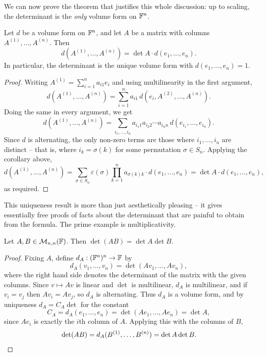 \documentclass[a4paper]{scrartcl}
\begin{document}
We can now prove the theorem that justifies this whole discussion: up to scaling, the determinant is the \emph{only} volume form on $\mathbb{F}^n$.

\begin{theorem}
    Let $d$ be a volume form on $\mathbb{F}^n$, and let $A$ be a matrix with columns $A^{(1)}, \dots, A^{(n)}$. Then
    $$
    d(A^{(1)}, \dots, A^{(n)}) = \det A \cdot d(e_1, \dots, e_n).
    $$
    In particular, the determinant is the unique volume form with $d(e_1, \dots, e_n) = 1$.
\end{theorem}
\begin{proof}
    Writing $A^{(1)} = \sum_{i = 1}^n a_{i1}e_i$ and using multilinearity in the first argument,
    $$
    d(A^{(1)}, \dots, A^{(n)}) = \sum_{i = 1}^n a_{i1}\, d(e_i, A^{(2)}, \dots, A^{(n)}).
    $$
    Doing the same in every argument, we get
    $$
    d(A^{(1)}, \dots, A^{(n)}) = \sum_{i_1, \dots, i_n} a_{i_1 1} a_{i_2 2}\cdots a_{i_n n}\, d(e_{i_1}, \dots, e_{i_n}).
    $$
    Since $d$ is alternating, the only non-zero terms are those where $i_1, \dots, i_n$ are distinct -- that is, where $i_k = \sigma(k)$ for some permutation $\sigma \in S_n$. Applying the corollary above,
    $$
    d(A^{(1)}, \dots, A^{(n)}) = \sum_{\sigma \in S_n} \varepsilon(\sigma) \prod_{k = 1}^n a_{\sigma(k)k} \cdot d(e_1, \dots, e_n) = \det A \cdot d(e_1, \dots, e_n),
    $$
    as required.
\end{proof}

This uniqueness result is more than just aesthetically pleasing -- it gives essentially free proofs of facts about the determinant that are painful to obtain from the formula. The prime example is multiplicativity.

\begin{theorem}
    Let $A, B \in \mathcal{M}_{n,n}(\mathbb{F})$. Then $\det (AB) = \det A \det B$.
\end{theorem}
\begin{proof}
    Fixing $A$, define $d_A: (\mathbb{F}^n)^n \rightarrow \mathbb{F}$ by
    $$
    d_A(v_1, \dots, v_n) = \det(Av_1, \dots, Av_n),
    $$
    where the right hand side denotes the determinant of the matrix with the given columns. Since $v \mapsto Av$ is linear and $\det$ is multilinear, $d_A$ is multilinear, and if $v_i = v_j$ then $Av_i = Av_j$, so $d_A$ is alternating. Thus $d_A$ is a volume form, and by uniqueness $d_A = C_A \det$ for the constant
    $$
    C_A = d_A(e_1, \dots, e_n) = \det(Ae_1, \dots, Ae_n) = \det A,
    $$
    since $Ae_i$ is exactly the $i$th column of $A$. Applying this with the columns of $B$,
    $$
    \det(AB) = d_A(B^{(1)}, \dots, B^{(n)}) = \det A \det B. \qedhere
    $$
\end{proof}
\end{document}
